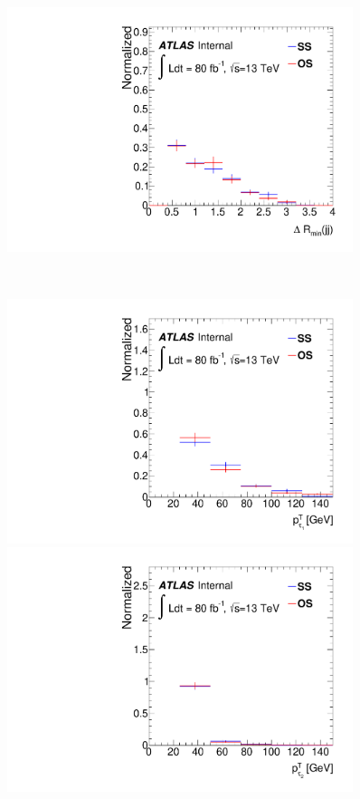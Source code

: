 \begin{figure}[htp]
\begin{minipage}[t]{0.33\linewidth}
\end{minipage}
\begin{minipage}[t]{0.33\linewidth}
\centering
\includegraphics[width=0.9\textwidth,angle=-90]{fig/OSvsSS_all/jjdrmin_1l2tau_F.pdf}
\end{minipage}\\
\begin{minipage}[t]{0.33\linewidth}
\centering
\includegraphics[width=0.9\textwidth,angle=-90]{fig/OSvsSS_all/tau_pt_0_F.pdf}
\end{minipage}
\begin{minipage}[t]{0.33\linewidth}
\centering
\includegraphics[width=0.9\textwidth,angle=-90]{fig/OSvsSS_all/tau_pt_1_F.pdf}

\end{minipage}
\end{figure}
